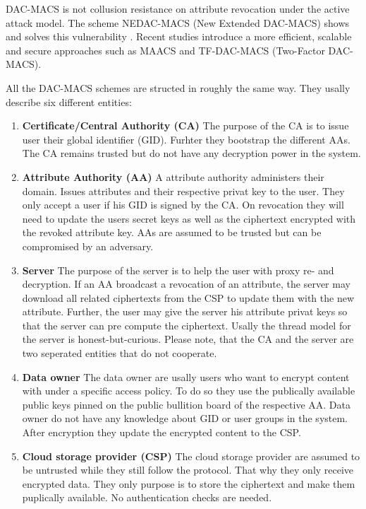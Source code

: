 \ac{DAC-MACS} is not collusion resistance on attribute revocation under the active attack model. The scheme \ac{NEDAC-MACS} (New Extended \ac{DAC-MACS}) shows and solves this vulnerability \cite{wu2017security}. Recent studies introduce a more efficient, scalable and secure approaches such as \ac{MAACS} \cite{li2016secure} and \ac{TF-DAC-MACS} (Two-Factor \ac{DAC-MACS})\cite{li2017two}. 

All the \ac{DAC-MACS} schemes are structed in roughly the same way. They usally describe six different entities:

\begin{enumerate}
	\item \textbf{Certificate/Central Authority (\ac{CA})} The purpose of the \ac{CA} is to issue user their global identifier (\ac{GID}). Furhter they bootstrap the different \ac{AA}s. The \ac{CA} remains trusted but do not have any decryption power in the system. 
	\item \textbf{Attribute Authority (\ac{AA})} A attribute authority administers their domain. Issues attributes and their respective privat key to the user. They only accept a user if his \ac{GID} is signed by the \ac{CA}. 
	On revocation they will need to update the users secret keys as well as the ciphertext encrypted with the revoked attribute key. \ac{AA}s are assumed to be trusted but can be compromised by an adversary.
	\item \textbf{Server} The purpose of the server is to help the user with proxy re- and decryption. If an \ac{AA} broadcast a revocation of an attribute, the server may download all related ciphertexts from the \ac{CSP} to update them with the new attribute. 
	Further, the user may give the server his attribute privat keys so that the server can pre compute the ciphertext. Usally the thread model for the server is honest-but-curious. Please note, that the \ac{CA} and the server are two seperated entities that do not cooperate.
	\item \textbf{Data owner} The data owner are usally users who want to encrypt content with under a specific access policy. To do so they use the publically available public keys pinned on the public bullition board of the respective \ac{AA}. Data owner do not have any knowledge about \ac{GID} or user groups in the system. After encryption they update the encrypted content to the \ac{CSP}.
	\item \textbf{Cloud storage provider (\ac{CSP})} The cloud storage provider are assumed to be untrusted while they still follow the protocol. That why they only receive encrypted data. They only purpose is to store the ciphertext and make them puplically available. No authentication checks are needed.

\end{enumerate}
